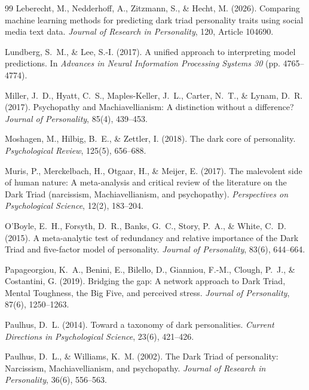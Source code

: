 \documentclass[11pt,twocolumn]{article}
\begin{document}
\begin{thebibliography}{99}
Leberecht, M., Nedderhoff, A., Zitzmann, S., \& Hecht, M. (2026). Comparing machine learning methods for predicting dark triad personality traits using social media text data. \textit{Journal of Research in Personality}, 120, Article 104690.

Lundberg, S.~M., \& Lee, S.-I. (2017). A unified approach to interpreting model predictions. In \textit{Advances in Neural Information Processing Systems 30} (pp. 4765--4774).

Miller, J.~D., Hyatt, C.~S., Maples-Keller, J.~L., Carter, N.~T., \& Lynam, D.~R. (2017). Psychopathy and Machiavellianism: A distinction without a difference? \textit{Journal of Personality}, 85(4), 439--453.

Moshagen, M., Hilbig, B.~E., \& Zettler, I. (2018). The dark core of personality. \textit{Psychological Review}, 125(5), 656--688.

Muris, P., Merckelbach, H., Otgaar, H., \& Meijer, E. (2017). The malevolent side of human nature: A meta-analysis and critical review of the literature on the Dark Triad (narcissism, Machiavellianism, and psychopathy). \textit{Perspectives on Psychological Science}, 12(2), 183--204.

O'Boyle, E.~H., Forsyth, D.~R., Banks, G.~C., Story, P.~A., \& White, C.~D. (2015). A meta-analytic test of redundancy and relative importance of the Dark Triad and five-factor model of personality. \textit{Journal of Personality}, 83(6), 644--664.

Papageorgiou, K.~A., Benini, E., Bilello, D., Gianniou, F.-M., Clough, P.~J., \& Costantini, G. (2019). Bridging the gap: A network approach to Dark Triad, Mental Toughness, the Big Five, and perceived stress. \textit{Journal of Personality}, 87(6), 1250--1263.

Paulhus, D.~L. (2014). Toward a taxonomy of dark personalities. \textit{Current Directions in Psychological Science}, 23(6), 421--426.

Paulhus, D.~L., \& Williams, K.~M. (2002). The Dark Triad of personality: Narcissism, Machiavellianism, and psychopathy. \textit{Journal of Research in Personality}, 36(6), 556--563.


\end{thebibliography}
\end{document}
